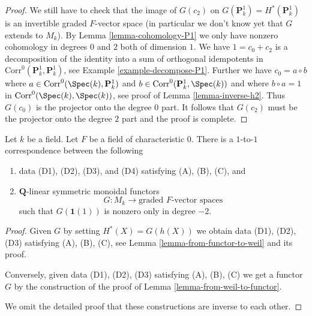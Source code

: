 \begin{proof}
\medskip\noindent
We still have to check that the image of $G(c_2)$ on
$G(\mathbf{P}^1_k) = H^*(\mathbf{P}^1_k)$
is an invertible graded $F$-vector space (in particular we don't know yet
that $G$ extends to $M_k$). By Lemma \ref{lemma-cohomology-P1}
we only have nonzero cohomology in degrees $0$ and $2$
both of dimension $1$. We have $1 = c_0 + c_2$ is a decomposition
of the identity into a sum of orthogonal idempotents in
$\text{Corr}^0(\mathbf{P}^1_k, \mathbf{P}^1_k)$, see
Example \ref{example-decompose-P1}. Further we have $c_0 = a \circ b$ where
$a \in \text{Corr}^0(\Spec(k), \mathbf{P}^1_k)$ and
$b \in \text{Corr}^0(\mathbf{P}^1_k, \Spec(k))$ and where
$b \circ a = 1$ in $\text{Corr}^0(\Spec(k), \Spec(k))$, see proof of
Lemma \ref{lemma-inverse-h2}. Thus $G(c_0)$ is the projector
onto the degree $0$ part. It follows that $G(c_2)$ must
be the projector onto the degree $2$ part and the proof is complete.
\end{proof}

\begin{proposition}
\label{proposition-weil-cohomology-theory}
Let $k$ be a field. Let $F$ be a field of characteristic $0$. There is a
$1$-to-$1$ correspondence between the following
\begin{enumerate}
\item data (D1), (D2), (D3), and (D4) satisfying (A), (B), (C), and
\item $\mathbf{Q}$-linear symmetric monoidal functors
$$
G : M_k \longrightarrow \text{graded }F\text{-vector spaces}
$$
such that $G(\mathbf{1}(1))$ is nonzero only in degree $-2$.
\end{enumerate}
\end{proposition}

\begin{proof}
Given $G$ by setting $H^*(X) = G(h(X))$ we obtain data (D1), (D2), (D3)
satisfying (A), (B), (C), see Lemma \ref{lemma-from-functor-to-weil}
and its proof.

\medskip\noindent
Conversely, given data (D1), (D2), (D3)
satisfying (A), (B), (C) we get a functor $G$ by the construction of
the proof of Lemma \ref{lemma-from-weil-to-functor}.

\medskip\noindent
We omit the detailed proof that these constructions are inverse
to each other.
\end{proof}











